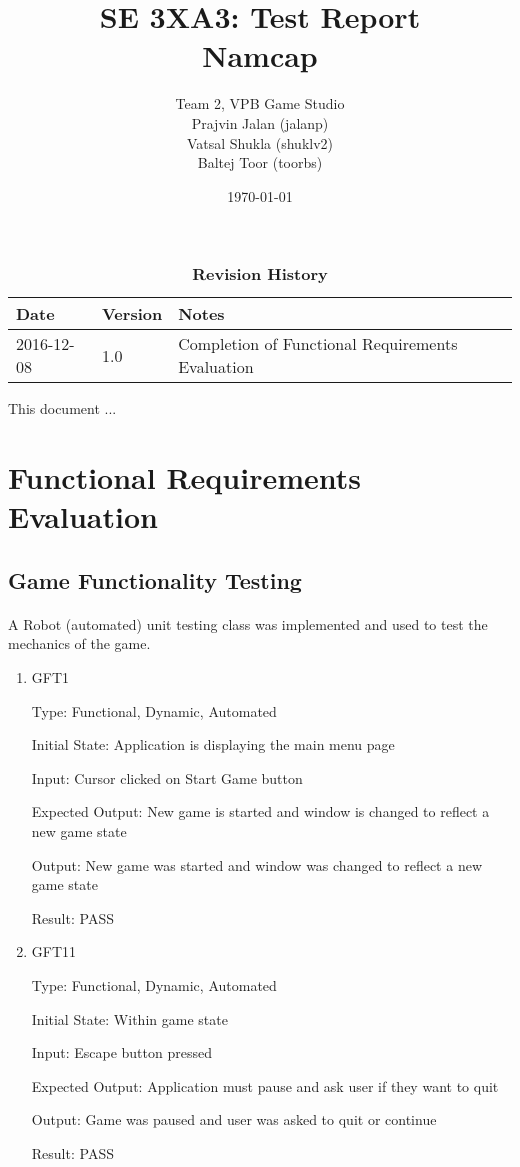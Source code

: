 \documentclass[12pt, titlepage]{article}
\title{SE 3XA3: Test Report\\Namcap}
\author{Team 2, VPB Game Studio
		\\ Prajvin Jalan (jalanp)
		\\ Vatsal Shukla (shuklv2)
		\\ Baltej Toor (toorbs)
}
\date{\today}
\begin{document}
\maketitle

\tableofcontents
\listoftables
\listoffigures

\begin{table}[bp]
\caption{\bf Revision History}
\begin{tabularx}{\textwidth}{p{3cm}p{2cm}X}
\toprule {\bf Date} & {\bf Version} & {\bf Notes}\\
\midrule
2016-12-08 & 1.0 & Completion of Functional Requirements Evaluation\\
\bottomrule
\end{tabularx}
\end{table}

\newpage


This document ...

\section{Functional Requirements Evaluation}

\subsection{Game Functionality Testing}

\paragraph{}
A Robot (automated) unit testing class was implemented and used to test the mechanics of the game.

\begin{enumerate}

\item{GFT1\\}

Type: Functional, Dynamic, Automated
					
Initial State: Application is displaying the main menu page
					
Input: Cursor clicked on Start Game button
					
Expected Output: New game is started and window is changed to reflect a new game state

Output: New game was started and window was changed to reflect a new game state

Result: PASS


\item{GFT11\\}

Type: Functional, Dynamic, Automated
					
Initial State: Within game state
					
Input: Escape button pressed
					
Expected Output: Application must pause and ask user if they want to quit

Output: Game was paused and user was asked to quit or continue

Result: PASS

\end{enumerate}
\end{document}
